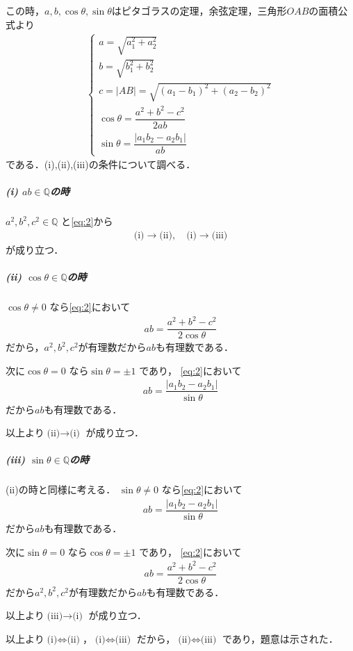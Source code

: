\documentclass[../../main.tex]{subfiles}
\begin{document}
この時，$a,b,\cos\theta,\sin\theta$はピタゴラスの定理，余弦定理，三角形$OAB$の面積公式より
\begin{align}
  \begin{cases}
    a = \sqrt{a_1^2 + a_2^2} \\
    b = \sqrt{b_1^2 + b_2^2} \\
    c = |AB| = \sqrt{(a_1 - b_1)^2 + (a_2 - b_2)^2} \\
    \cos\theta = \dfrac{a^2 + b^2 - c^2}{2ab} \\
    \sin\theta = \dfrac{|a_1 b_2 - a_2 b_1|}{ab}
  \end{cases} \label{eq:2}
\end{align}
である．(i),(ii),(iii)の条件について調べる．

\subparagraph{(i) $ab\in \mathbb{Q}$の時}
$a^2, b^2, c^2 \in \mathbb{Q}$ と\cref{eq:2}から
\begin{align}
  \text{(i)} \to \text{(ii)}, \quad \text{(i)} \to \text{(iii)}
\end{align}
が成り立つ．

\subparagraph{(ii) $\cos\theta \in \mathbb{Q}$の時}

$\cos\theta \neq 0$ なら\cref{eq:2}において
\begin{align}
  ab = \dfrac{a^2 + b^2 - c^2}{2\cos\theta}
\end{align}
だから，$a^2,b^2,c^2$が有理数だから$ab$も有理数である．

次に$\cos\theta = 0$ なら$\sin\theta = \pm 1$ であり，
\cref{eq:2}において
\begin{align}
  ab = \dfrac{|a_1 b_2 - a_2 b_1|}{\sin\theta}
\end{align}
だから$ab$も有理数である．

以上より$\text{(ii)} \to \text{(i)}$ が成り立つ．

\subparagraph{(iii) $\sin\theta \in \mathbb{Q}$の時}

(ii)の時と同様に考える．
$\sin\theta \neq 0$ なら\cref{eq:2}において
\begin{align}
  ab = \dfrac{|a_1 b_2 - a_2 b_1|}{\sin\theta}
\end{align}
だから$ab$も有理数である．

次に$\sin\theta = 0$ なら$\cos\theta = \pm 1$ であり，
\cref{eq:2}において
\begin{align}
  ab = \dfrac{a^2 + b^2 - c^2}{2\cos\theta}
\end{align}
だから$a^2,b^2,c^2$が有理数だから$ab$も有理数である．

以上より$\text{(iii)} \to \text{(i)}$ が成り立つ．

\casesend

以上より$\text{(i)} \iff \text{(ii)}$，$\text{(i)} \iff \text{(iii)}$ だから，$\text{(ii)} \iff \text{(iii)}$ であり，題意は示された．
\end{document}
